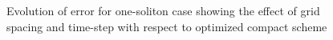 \documentclass{svjour3}                    %
\begin{document}
\begin{figure}[h!]
{}
\caption{Evolution of error for one-soliton case showing the effect of grid spacing and time-step with respect to optimized compact scheme}
\label{fig:one1}
\end{figure}


\begin{figure}[h!]
\centerline{
}
\end{figure}
\end{document}
